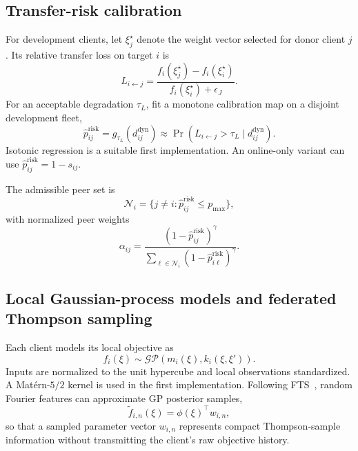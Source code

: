 \documentclass[conference]{IEEEtran}
\newcommand{\distdyn}{d^{\mathrm{dyn}}}
\begin{document}
\subsection{Transfer-risk calibration}
For development clients, let $\xi_j^\star$ denote the weight vector selected for donor client $j$. Its relative transfer loss on target $i$ is
\begin{equation}
    L_{i\leftarrow j}=
    \frac{f_i(\xi_j^\star)-f_i(\xi_i^\star)}
         {f_i(\xi_i^\star)+\epsilon_J}.
    \label{eq:transfer_loss}
\end{equation}
For an acceptable degradation $\tau_L$, fit a monotone calibration map on a disjoint development fleet,
\begin{equation}
    \hat p_{ij}^{\mathrm{risk}}=g_{\tau_L}(\distdyn_{ij})
    \approx\Pr(L_{i\leftarrow j}>\tau_L\mid\distdyn_{ij}).
\end{equation}
Isotonic regression is a suitable first implementation. An online-only variant can use $\hat p_{ij}^{\mathrm{risk}}=1-s_{ij}$.

The admissible peer set is
\begin{equation}
    \mathcal N_i=\{j\neq i:\hat p_{ij}^{\mathrm{risk}}\le p_{\max}\},
\end{equation}
with normalized peer weights
\begin{equation}
    \alpha_{ij}=
    \frac{(1-\hat p_{ij}^{\mathrm{risk}})^\gamma}
    {\sum_{\ell\in\mathcal N_i}(1-\hat p_{i\ell}^{\mathrm{risk}})^\gamma}.
\end{equation}

\subsection{Local Gaussian-process models and federated Thompson sampling}
Each client models its local objective as
\begin{equation}
    f_i(\xi)\sim\mathcal{GP}(m_i(\xi),k_i(\xi,\xi')).
\end{equation}
Inputs are normalized to the unit hypercube and local observations standardized. A Mat\'ern-$5/2$ kernel is used in the first implementation. Following FTS~\cite{dai2020fts}, random Fourier features can approximate GP posterior samples,
\begin{equation}
    \tilde f_{i,n}(\xi)=\phi(\xi)^\top w_{i,n},
\end{equation}
so that a sampled parameter vector $w_{i,n}$ represents compact Thompson-sample information without transmitting the client's raw objective history.
\end{document}
